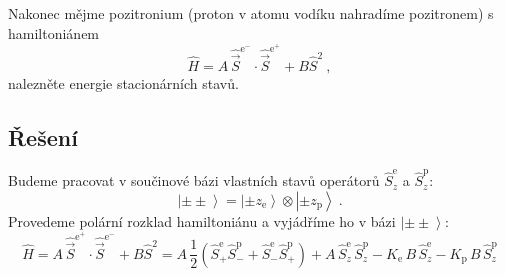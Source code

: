 \documentclass[10pt,a4paper]{article}
\newcommand{\const}[1]{\text{#1}}
\newcommand{\ket}[1]{\left| #1 \right>}
\begin{document}
Nakonec mějme pozitronium (proton v atomu vodíku nahradíme pozitronem) s hamiltoniánem
\begin{equation*}
    \hat H
    = A \, \hat{\vec S}^{\const{e}^-} \!\! \cdot \hat{\vec S}^{\const{e}^+}
    + B \hat S^2
    \: ,
\end{equation*}
nalezněte energie stacionárních stavů.

\subsection{Řešení}
Budeme pracovat v součinové bázi vlastních stavů operátorů $\hat S_{\!z}^\const{e}$ a $\hat S_{\!z}^\const{p}$:
\begin{equation*}
    \ket{\pm\pm} = \ket{\pm z_\const{e}} \otimes \ket{\pm z_\const{p}} \: .
\end{equation*}
Provedeme polární rozklad hamiltoniánu a vyjádříme ho v bázi $\ket{\pm\pm}$:
\begin{equation*}
    \hat H
    = A \, \hat{\vec S}^{\const{e}^+} \cdot \hat{\vec S}^{\const{e}^-} + B \hat S^2
    = A \, \frac{1}{2} \! \left( \hat S_{\!+}^\const{e} \hat S_{\!-}^\const{p} + \hat S_{\!-}^\const{e} \hat S_{\!+}^\const{p} \right) + A \,\hat S_{\!z}^\const{e} \, \hat S_{\!z}^\const{p} - K_\const{e} \, B \, \hat S_{\!z}^\const{e} - K_\const{p} \, B \, \hat S_{\!z}^\const{p}
\end{equation*}
\end{document}
